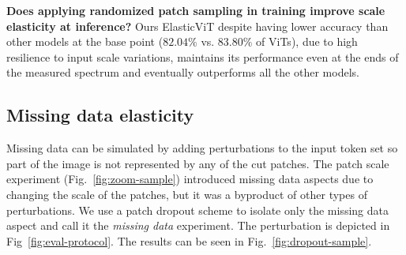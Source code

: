 \documentclass[10pt,twocolumn,letterpaper]{article}
\newcommand{\ours}[0]{ElasticViT\xspace}
\begin{document}
\textbf{Does applying randomized patch sampling in training improve scale elasticity at inference?}
Ours \ours{} despite having lower accuracy than other models at the base point ($82.04\%$ vs. $83.80\%$ of ViTs), due to high resilience to input scale variations, maintains its performance even at the ends of the measured spectrum and eventually outperforms all the other models.

\subsection{Missing data elasticity} \label{sec:missing-data}


Missing data can be simulated by adding perturbations to the input token set so part of the image is not represented by any of the cut patches. The patch scale experiment (Fig.~\ref{fig:zoom-sample}) introduced missing data aspects due to changing the scale of the patches, but it was a byproduct of other types of perturbations. We use a patch dropout scheme to isolate only the missing data aspect and call it the \textit{missing data} experiment.
The perturbation is depicted in Fig~\ref{fig:eval-protocol}. The results can be seen in Fig.~\ref{fig:dropout-sample}.
\end{document}
